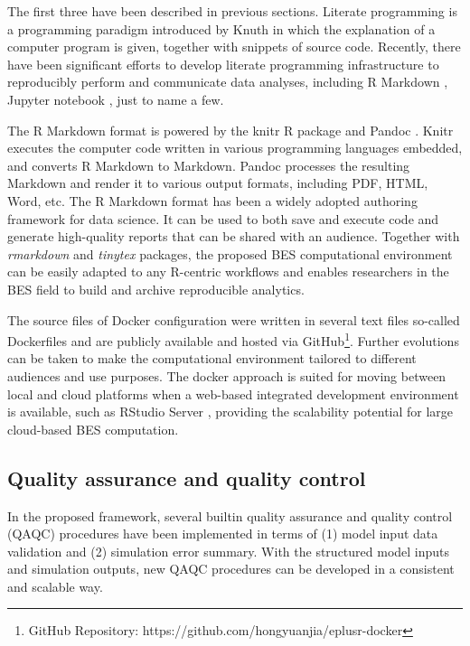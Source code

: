 \documentclass[3p, times]{elsarticle} %
\begin{document}
The first three have been described in previous sections. Literate programming
is a programming paradigm introduced by Knuth \citep{Knuth1984} in which the
explanation of a computer program is given, together with snippets of source
code.
Recently, there have been significant efforts to develop literate programming
infrastructure to reproducibly perform and communicate data analyses, including
R Markdown \citep{Grolemund2018} , Jupyter notebook \citep{Kluyver2016}, just to name a
few.

The R Markdown format is powered by the knitr R package \citep{Xie2015} and Pandoc
\citep{Krewinkel2017}.
Knitr executes the computer code written in various programming languages
embedded, and converts R Markdown to Markdown.
Pandoc processes the resulting Markdown and render it to various output
formats, including PDF, HTML, Word, etc.
The R Markdown format has been a widely adopted authoring framework for data
science.
It can be used to both save and execute code and generate high-quality reports
that can be shared with an audience.
Together with \emph{rmarkdown} \citep{Allaire2020} and \emph{tinytex} \citep{Xie2019} packages, the
proposed BES computational environment can be easily adapted to any R-centric
workflows and enables researchers in the BES field to build and archive
reproducible analytics.

The source files of Docker configuration were written in several text files
so-called Dockerfiles and are publicly available and hosted via GitHub\footnote{GitHub
  Repository: https://github.com/hongyuanjia/eplusr-docker}. Further
evolutions can be taken to make the computational environment tailored to
different audiences and use purposes. The docker approach is
suited for moving between local and cloud platforms when a web-based integrated
development environment is available, such as RStudio Server \citep{Boettiger2015},
providing the scalability potential for large cloud-based BES computation.

\hypertarget{quality-assurance-and-quality-control}{%
\subsection{Quality assurance and quality control}\label{quality-assurance-and-quality-control}}

In the proposed framework, several builtin quality assurance and quality
control (QAQC) procedures have been implemented in terms of (1) model input data
validation and (2) simulation error summary.
With the structured model inputs and simulation outputs, new QAQC procedures
can be developed in a consistent and scalable way.
\end{document}
